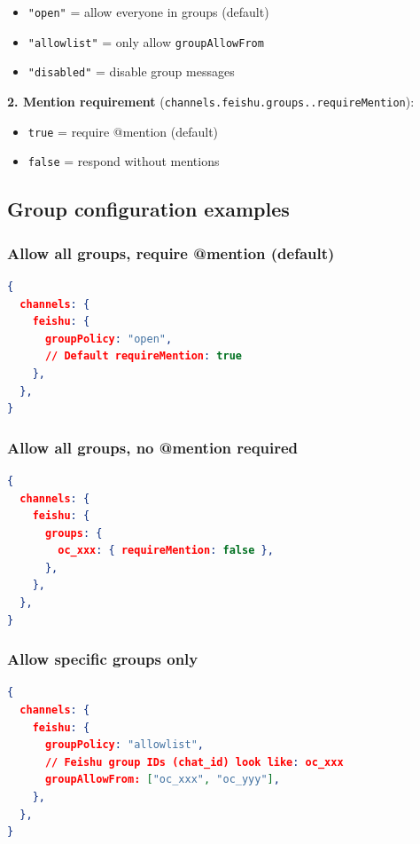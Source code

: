 \begin{itemize}
  \item \texttt{"open"} = allow everyone in groups (default)
  \item \texttt{"allowlist"} = only allow \texttt{groupAllowFrom}
  \item \texttt{"disabled"} = disable group messages
\end{itemize}


\textbf{2. Mention requirement} (\texttt{channels.feishu.groups..requireMention}):

\begin{itemize}
  \item \texttt{true} = require @mention (default)
  \item \texttt{false} = respond without mentions
\end{itemize}


\hrulefill


\subsection{Group configuration examples}


\subsubsection{Allow all groups, require @mention (default)}


\begin{lstlisting}[language=json]
{
  channels: {
    feishu: {
      groupPolicy: "open",
      // Default requireMention: true
    },
  },
}
\end{lstlisting}


\subsubsection{Allow all groups, no @mention required}


\begin{lstlisting}[language=json]
{
  channels: {
    feishu: {
      groups: {
        oc_xxx: { requireMention: false },
      },
    },
  },
}
\end{lstlisting}


\subsubsection{Allow specific groups only}


\begin{lstlisting}[language=json]
{
  channels: {
    feishu: {
      groupPolicy: "allowlist",
      // Feishu group IDs (chat_id) look like: oc_xxx
      groupAllowFrom: ["oc_xxx", "oc_yyy"],
    },
  },
}
\end{lstlisting}


